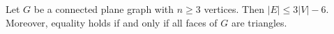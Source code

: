 

\setcounter{section}{3}
\setcounter{subsection}{2}
\setcounter{dfn}{9}

\begin{thm}
\label{thm:3V-6}
Let $G$ be a connected plane graph with $n \ge 3$ vertices.
Then $|E| \le 3|V| - 6$.
Moreover, equality holds if and only if all faces of $G$ are triangles.
\end{thm}

